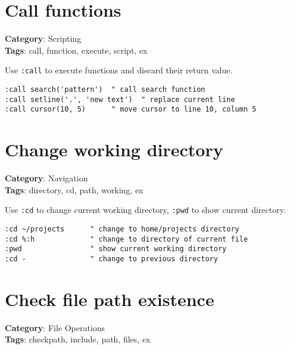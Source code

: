 {{{{{\section{Call functions}

\textbf{Category}: Scripting\\ \textbf{Tags}: call, function, execute, script, ex
\vspace{0.5cm}

Use {\footnotesize \Verb§:call§} to execute functions and discard their return value.

\begin{Exa*}{}
\begin{Verbatim}[fontsize=\footnotesize, breaklines, breakanywhere]
:call search('pattern')  " call search function
:call setline('.', 'new text')  " replace current line
:call cursor(10, 5)      " move cursor to line 10, column 5
\end{Verbatim}
\end{Exa*}

\section{Change working directory}

\textbf{Category}: Navigation\\ \textbf{Tags}: directory, cd, path, working, ex
\vspace{0.5cm}

Use {\footnotesize \Verb§:cd§} to change current working directory, {\footnotesize \Verb§:pwd§} to show current directory.

\begin{Exa*}{}
\begin{Verbatim}[fontsize=\footnotesize, breaklines, breakanywhere]
:cd ~/projects      " change to home/projects directory
:cd %:h             " change to directory of current file
:pwd                " show current working directory
:cd -               " change to previous directory
\end{Verbatim}
\end{Exa*}

\section{Check file path existence}

\textbf{Category}: File Operations\\ \textbf{Tags}: checkpath, include, path, files, ex
\vspace{0.5cm}

}}}}}
